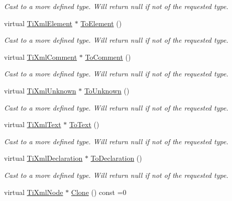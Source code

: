 \begin{DoxyCompactItemize}
\begin{DoxyCompactList}\small\item\em Cast to a more defined type. Will return null if not of the requested type. \end{DoxyCompactList}\item 
virtual \hyperlink{class_ti_xml_element}{TiXmlElement} $\ast$ \hyperlink{class_ti_xml_node_aa65d000223187d22a4dcebd7479e9ebc}{ToElement} ()
\begin{DoxyCompactList}\small\item\em Cast to a more defined type. Will return null if not of the requested type. \end{DoxyCompactList}\item 
virtual \hyperlink{class_ti_xml_comment}{TiXmlComment} $\ast$ \hyperlink{class_ti_xml_node_a383e06a0787f7063953934867990f849}{ToComment} ()
\begin{DoxyCompactList}\small\item\em Cast to a more defined type. Will return null if not of the requested type. \end{DoxyCompactList}\item 
virtual \hyperlink{class_ti_xml_unknown}{TiXmlUnknown} $\ast$ \hyperlink{class_ti_xml_node_a06de5af852668c7e4af0d09c205f0b0d}{ToUnknown} ()
\begin{DoxyCompactList}\small\item\em Cast to a more defined type. Will return null if not of the requested type. \end{DoxyCompactList}\item 
virtual \hyperlink{class_ti_xml_text}{TiXmlText} $\ast$ \hyperlink{class_ti_xml_node_a3ddfbcac78fbea041fad57e5c6d60a03}{ToText} ()
\begin{DoxyCompactList}\small\item\em Cast to a more defined type. Will return null if not of the requested type. \end{DoxyCompactList}\item 
virtual \hyperlink{class_ti_xml_declaration}{TiXmlDeclaration} $\ast$ \hyperlink{class_ti_xml_node_a4027136ca820ff4a636b607231b6a6df}{ToDeclaration} ()
\begin{DoxyCompactList}\small\item\em Cast to a more defined type. Will return null if not of the requested type. \end{DoxyCompactList}\item 
virtual \hyperlink{class_ti_xml_node}{TiXmlNode} $\ast$ \hyperlink{class_ti_xml_node_a4508cc3a2d7a98e96a54cc09c37a78a4}{Clone} () const =0

\end{DoxyCompactItemize}
